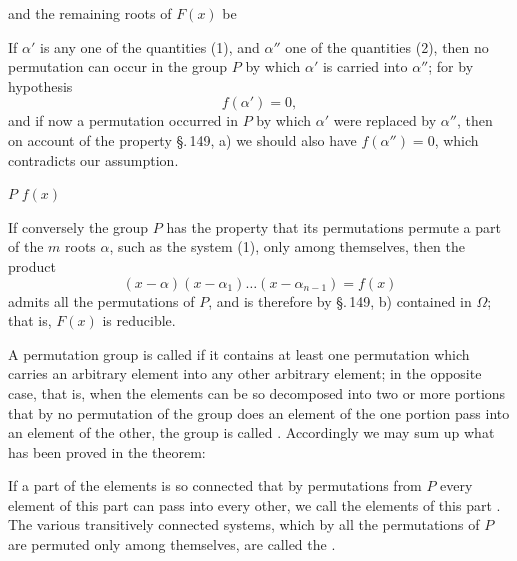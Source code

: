 and the remaining roots of $F(x)$ be

If $\alpha'$ is any one of the quantities (1), and $\alpha''$ one of the
quantities (2), then no permutation can occur in the group $P$ by which
$\alpha'$ is carried into $\alpha''$; for by hypothesis
\[
f(\alpha') = 0,
\]
and if now a permutation occurred in $P$ by which $\alpha'$ were replaced by
$\alpha''$, then on account of the property \S.\,149, a) we should also have
$f(\alpha'') = 0$, which contradicts our assumption.

 $P$  $f(x)$

If conversely the group $P$ has the property that its permutations permute a
part of the $m$ roots $\alpha$, such as the system (1), only among
themselves, then the product
\[
(x - \alpha)(x - \alpha_1) \ldots (x - \alpha_{n-1}) = f(x)
\]
admits all the permutations of $P$, and is therefore by \S.\,149, b)
contained in $\Omega$; that is, $F(x)$ is reducible.

A permutation group is called  if it contains at least
one permutation which carries an arbitrary element into any other arbitrary
element; in the opposite case, that is, when the elements can be so
decomposed into two or more portions that by no permutation of the group
does an element of the one portion pass into an element of the other,
the group is called
. Accordingly we may sum up what has been proved in
the theorem:


If a part of the elements is so connected that by permutations from $P$
every element of this part can pass into every other, we call the elements
of this part . The various transitively
connected systems, which by all the permutations of $P$ are permuted only
among themselves, are called the .
